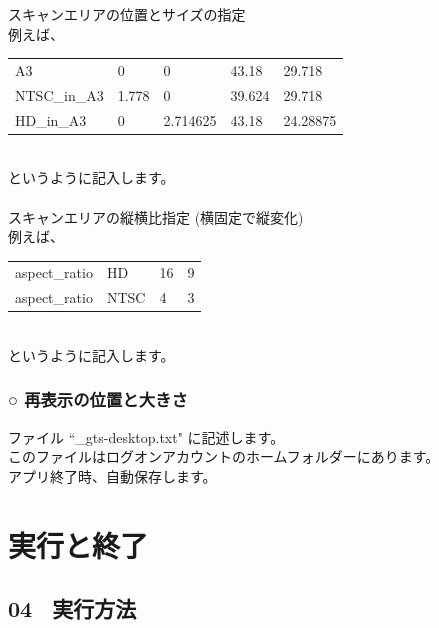 \documentclass[a4paper,10pt]{article}
\begin{document}
\noindent スキャンエリアの位置とサイズの指定\\
例えば、\\[-1.25em]

\setlength{\tabcolsep}{0em}
\renewcommand{\arraystretch}{1.0}
\noindent\begin{tabular}{p{8.5em}p{8.5em}p{8.5em}p{8.5em}l}
A3 & 0 & 0 & 43.18 & 29.718\\
NTSC\_in\_A3 & 1.778 & 0 & 39.624 & 29.718\\
HD\_in\_A3 & 0 & 2.714625 & 43.18 & 24.28875\\
\end{tabular}\\[-0.5em]

\noindent というように記入します。\\
\\
スキャンエリアの縦横比指定 (横固定で縦変化)\\
例えば、\\[-1.25em]

\setlength{\tabcolsep}{0em}
\renewcommand{\arraystretch}{1.0}
\noindent\begin{tabular}{p{8.5em}p{8.5em}p{8.5em}l}
aspect\_ratio & HD & 16 & 9\\
aspect\_ratio & NTSC & 4 & 3\\
\end{tabular}\\[-0.5em]

\noindent というように記入します。\\

\subsubsection*{○ 再表示の位置と大きさ}

\noindent ファイル “\_gts-desktop.txt" に記述します。\\
このファイルはログオンアカウントのホームフォルダーにあります。\\
アプリ終了時、自動保存します。

\newpage

\section*{実行と終了}

\subsection*{04 \ 実行方法}
\end{document}
